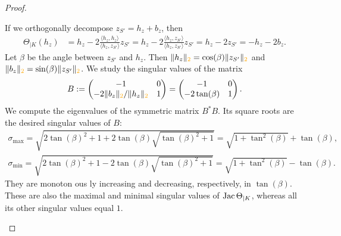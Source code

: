 \documentclass[10pt,letterpaper]{article}
\newcommand\cye[1]{%
  \protect\leavevmode
  \begingroup
    \color{red!35!yellow}%
    #1%
  \endgroup
}
\begin{document}
\begin{proof}
\begin{itemize}
        If we orthogonally decompose $z_{S'} = h_z + b_z$, then 
        \begin{align*}
            \Theta_{|K}( h_z ) 
            &= 
            h_z
            - 
            2 \frac{\langle h_z, h_z \rangle}{\langle h_z, z_{S'} \rangle} z_{S'}
            = 
            h_z
            - 
            2 \frac{\langle h_z, z_{S'} \rangle}{\langle h_z, z_{S'} \rangle} z_{S'}
            = 
            h_z
            - 
            2 z_{S'}
            = 
            - h_{z}
            - 
            2 b_{z}
            .
        \end{align*}
        Let $\beta$ be the angle between $z_{S'}$ and $h_{z}$. 
        Then $\| h_z \|_{\cye{2}} = \cos(\beta) \|z_{S'}\|_{\cye{2}}$ and $\| b_z \|_{\cye{2}} = \sin(\beta) \|z_{S'}\|_{\cye{2}}$. 
        We study the singular values of the matrix 
        \begin{align*}
            B 
            := 
            \begin{pmatrix}
            -1                 & 0
            \\ 
            -2 \|b_z\|_{\cye{2}}/\|h_z\|_{\cye{2}} & 1
            \end{pmatrix}
            =
            \begin{pmatrix}
            -1             & 0
            \\ 
            -2 \tan(\beta) & 1
            \end{pmatrix}
            .
        \end{align*}
        We compute the eigenvalues of the symmetric matrix $B^{\ast} B$. 
        Its square roots are the desired singular values of $B$:
        \begin{align*}
            \sigma_{\max} = \sqrt{ 2\tan(\beta)^2 + 1 + 2 \tan(\beta) \sqrt{ \tan(\beta)^2 + 1 } } = \sqrt{ 1 + \tan^{2}(\beta) } + \tan(\beta)
            ,
            \\
            \sigma_{\min} = \sqrt{ 2\tan(\beta)^2 + 1 - 2 \tan(\beta) \sqrt{ \tan(\beta)^2 + 1 } } = \sqrt{ 1 + \tan^{2}(\beta) } - \tan(\beta)
            .
        \end{align*}
        They are monoton\cye{ous}ly increasing and decreasing, respectively, in $\tan(\beta)$. 
        These are also the maximal and minimal singular values of $\operatorname{{\rm Jac}}\Theta_{|K}$,
        whereas all its other singular values equal $1$. 
        

\end{itemize}
\end{proof}
\end{document}
